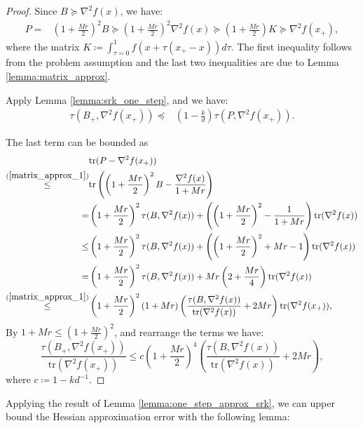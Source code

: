 \begin{proof}
    Since $B \succeq \nabla^2 f(x)$, we have:
    \begin{align*}
        P =& (1 + \frac{M r}{2})^2 B \succeq (1 + \frac{M r}{2})^2 \nabla^2 f(x) \succeq (1 + \frac{Mr}{2}) K \succeq \nabla^2 f(x_+),
    \end{align*}
    where the matrix $K \coloneqq \int_{\tau = 0}^1 f(x + \tau (x_{+} - x)) d \tau$. 
    The first inequality follows from the problem assumption and the last two inequalities are due to Lemma \ref{lemma:matrix_approx}. 
   
    Apply Lemma \ref{lemma:srk_one_step}, and we have:
    \begin{align*}
        \tau(B_{+}, \nabla^2 f(x_{+})) \preceq & \left(1 - \frac{k}{d} \right) \tau(P, \nabla^2 f(x_{+})) .
    \end{align*}
    
    The last term can be bounded as 
    \begin{align*}
         & \mathrm{tr}(P - \nabla^2 f(x_{+})) \\
         \overset{(\ref{matrix_approx_1})}{\leq} & \mathrm{tr}\left(\left(1 + \frac{Mr}{2}\right)^2 B - \frac{\nabla^2 f(x)}{1 + M r}\right) \\
         = & \left(1 + \frac{Mr}{2}\right)^2 \tau (B, \nabla^2 f(x)) + \left(\left(1 + \frac{Mr}{2}\right)^2 - \frac{1}{1 + M r}\right) \mathrm{tr}(\nabla^2 f(x)) \\
         \leq & \left(1 + \frac{Mr}{2}\right)^2 \tau (B, \nabla^2 f(x)) + \left(\left(1 + \frac{Mr}{2}\right)^2 + Mr - 1\right) \mathrm{tr}(\nabla^2 f(x)) \\
         = & \left(1 + \frac{Mr}{2}\right)^2 \tau (B, \nabla^2 f(x)) +  M r \left( 2 + \frac{Mr}{4} \right) \mathrm{tr}(\nabla^2 f(x)) \\
         \overset{(\ref{matrix_approx_1})}{\leq} & \left(1 + \frac{Mr}{2}\right)^2 (1 + M r)\left(\frac{\tau (B, \nabla^2 f(x))}{\mathrm{tr}(\nabla^2 f(x))} +  2 M r  \right) \mathrm{tr}(\nabla^2 f(x_{+})), \\
    \end{align*}
    By $ 1 + Mr \leq (1 + \frac{Mr}{2})^2$, and rearrange the terms we have:
    \begin{equation*}
        \frac{\tau(B_{+}, \nabla^2 f(x_{+}))}{\mathrm{tr}(\nabla^2 f(x_{+}))} \leq c\left(1 + \frac{Mr}{2}\right)^4 \left(\frac{\tau (B, \nabla^2 f(x))}{\mathrm{tr}(\nabla^2 f(x))} + 2 M r  \right),
    \end{equation*}
    where $c\coloneqq 1 - k d^{-1}$.
\end{proof}
Applying the result of Lemma \ref{lemma:one_step_approx_srk}, we can upper bound the Hessian approximation error with the following lemma:

